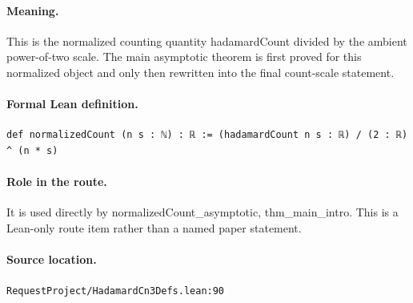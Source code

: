 \medskip
\paragraph{Meaning.}
This is the normalized counting quantity hadamardCount divided by the ambient power-of-two scale. The main asymptotic theorem is first proved for this normalized object and only then rewritten into the final count-scale statement.
\paragraph{Formal Lean definition.}
\begin{verbatim}
def normalizedCount (n s : ℕ) : ℝ := (hadamardCount n s : ℝ) / (2 : ℝ) ^ (n * s)
\end{verbatim}
\paragraph{Role in the route.}
It is used directly by normalizedCount\_asymptotic, thm\_main\_intro. This is a Lean-only route item rather than a named paper statement.
\paragraph{Source location.}
\texttt{RequestProject/HadamardCn3Defs.lean:90}
\medskip
